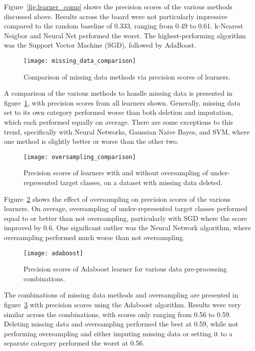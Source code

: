 \documentclass[conference]{IEEEtran}
\begin{document}
Figure~\ref{fig:learner_comp} shows the precision scores of the various methods discussed above. Results across the board were not particularly impressive compared to the random baseline of 0.333, ranging from 0.49 to 0.61. k-Nearest Neigbor and Neural Net performed the worst. The highest-performing algorithm was the Support Vector Machine (SGD), followed by AdaBoost.

\begin{figure}[htpb]
	\centering
	\texttt{[image: missing\_data\_comparison]}
	\caption{Comparison of missing data methods via precision scores of learners.}
	\label{fig:missing_data_comp}
\end{figure}

A comparison of the various methods to handle missing data is presented in figure~\ref{fig:missing_data_comp}, with precision scores from all learners shown. Generally, missing data set to its own category performed worse than both deletion and imputation, which each performed equally on average. There are some exceptions to this trend, specifically with Neural Networks, Gaussian Naive Bayes, and SVM, where one method is slightly better or worse than the other two.

\begin{figure}[htpb]
	\centering
	\texttt{[image: oversampling\_comparison]}
	\caption{Precision scores of learners with and without oversampling of under-represented target classes, on a dataset with missing data deleted.}
	\label{fig:oversampling_comp}
\end{figure}

Figure~\ref{fig:oversampling_comp} shows the effect of oversampling on precision scores of the various learners. On average, oversampling of under-represented target classes performed equal to or better than not oversampling, particularly with SGD where the score improved by 0.6. One significant outlier was the Neural Network algorithm, where oversampling performed much worse than not oversampling.

\begin{figure}[htpb]
	\centering
	\texttt{[image: adaboost]}
	\caption{Precision scores of Adaboost learner for various data pre-processing combinations.}
	\label{fig:adaboost}
\end{figure}

The combinations of missing data methods and oversampling are presented in figure~\ref{fig:adaboost} with precision scores using the Adaboost algorithm. Results were very similar across the combinations, with scores only ranging from 0.56 to 0.59. Deleting missing data and oversampling performed the best at 0.59, while not performing oversampling and either imputing missing data or setting it to a separate category performed the worst at 0.56.
\end{document}
